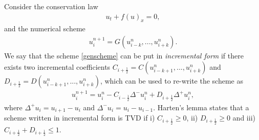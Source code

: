 \documentclass{article}
\newcommand{\iph}{{i + \frac{1}{2}}}
\newcommand{\imh}{{i - \frac{1}{2}}}
\begin{document}



Consider the conservation law
\begin{gather} \label{conlaw}
	u_t+f(u)_x=0,
\end{gather}%
and the numerical scheme
\begin{gather} \label{genscheme}
	u^{n+1}_i = G(u^n_{i-k},...,u^n_{i+k}).
\end{gather}%
We say that the scheme \eqref{genscheme} can be put in \textit{incremental form} if there exists two incremental coefficients $C_\iph = C(u_{i-k+1}^n,...,u_{i+k}^n)$ and $D_\iph = D(u_{i-k+1}^n,...,u_{i+k}^n)$, which can be used to re-write the scheme as
\begin{gather} \label{incform}
	u^{n+1}_i = u_i^n - C_\imh \Delta^-u^n_i + D_\iph \Delta^+u^n_i,
\end{gather}%
where $\Delta^+u_i = u_{i+1} - u_i$ and $\Delta^-u_i = u_i- u_{i-1}$. Harten's lemma states that a scheme written in incremental form is TVD if i) $C_\iph \geq 0$, ii) $D_\iph \geq 0$ and iii) $C_\iph + D_\iph \leq 1$.
\end{document}
